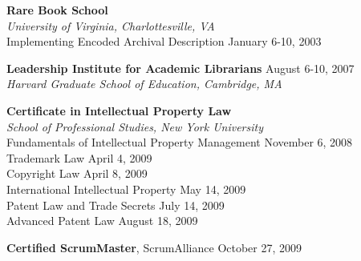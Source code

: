 \documentclass[10pt]{res} %
\begin{document}
\begin{resume}
\vspace{8pt} %

{\bf Rare Book School} \\
{\sl University of Virginia, Charlottesville, VA } \\
Implementing Encoded Archival Description \hfill January 6-10, 2003 

{\bf Leadership Institute for Academic Librarians} \hfill August 6-10, 2007 \\
{\sl Harvard Graduate School of Education, Cambridge, MA } 

{\bf Certificate in Intellectual Property Law} \\
{\sl School of Professional Studies, New York University} \\
Fundamentals of Intellectual Property Management \hfill November 6, 2008 \\
Trademark Law \hfill April 4, 2009 \\
Copyright Law \hfill April 8, 2009 \\
International Intellectual Property \hfill  May 14, 2009 \\
Patent Law and Trade Secrets \hfill July 14, 2009 \\
Advanced Patent Law \hfill August 18, 2009

{\bf Certified ScrumMaster}, ScrumAlliance \hfill October 27, 2009


\end{resume}
\end{document}
